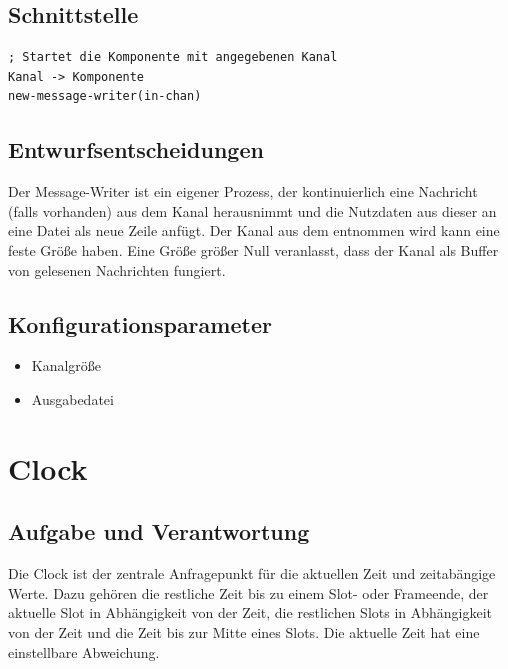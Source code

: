 \documentclass[draft=false
              ,paper=a4
              ,twoside=false
              ,fontsize=11pt
              ,headsepline
              ,BCOR10mm
              ,DIV11
              ]{scrbook}
\begin{document}
\subsection{Schnittstelle}
\begin{lstlisting}
; Startet die Komponente mit angegebenen Kanal
Kanal -> Komponente
new-message-writer(in-chan)
\end{lstlisting}

\subsection{Entwurfsentscheidungen}
Der Message-Writer ist ein eigener Prozess, der kontinuierlich eine Nachricht (falls vorhanden) aus dem Kanal herausnimmt und die Nutzdaten aus dieser an eine Datei als neue Zeile anfügt. Der Kanal aus dem entnommen wird kann eine feste Größe haben. Eine Größe größer Null veranlasst, dass der Kanal als Buffer von gelesenen Nachrichten fungiert.

\subsection{Konfigurationsparameter}
\begin{itemize}
	\item Kanalgröße
	\item Ausgabedatei
\end{itemize}

\section{Clock}
\subsection{Aufgabe und Verantwortung}
Die Clock ist der zentrale Anfragepunkt für die aktuellen Zeit und zeitabängige Werte. Dazu gehören die restliche Zeit bis zu einem Slot- oder Frameende, der aktuelle Slot in Abhängigkeit von der Zeit, die restlichen Slots in Abhängigkeit von der Zeit und die Zeit bis zur Mitte eines Slots. Die aktuelle Zeit hat eine einstellbare Abweichung.
\end{document}
